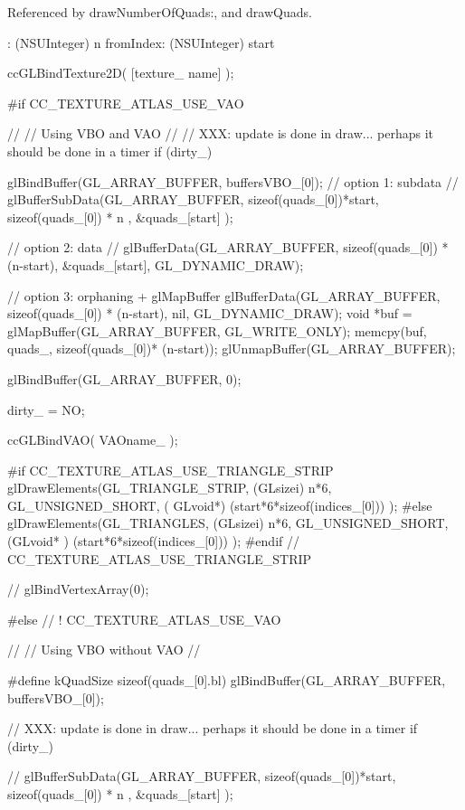 Referenced by draw\-Number\-Of\-Quads\-:, and draw\-Quads.


\begin{DoxyCode}
                         : (NSUInteger) n fromIndex: (NSUInteger) start
{
        ccGLBindTexture2D( [texture_ name] );

#if CC_TEXTURE_ATLAS_USE_VAO

        //
        // Using VBO and VAO
        //
        // XXX: update is done in draw... perhaps it should be done in a timer
        if (dirty_) {
                glBindBuffer(GL_ARRAY_BUFFER, buffersVBO_[0]);
                // option 1: subdata
//              glBufferSubData(GL_ARRAY_BUFFER, sizeof(quads_[0])*start,
       sizeof(quads_[0]) * n , &quads_[start] );
                
                // option 2: data
//              glBufferData(GL_ARRAY_BUFFER, sizeof(quads_[0]) * (n-start),
       &quads_[start], GL_DYNAMIC_DRAW);
                
                // option 3: orphaning + glMapBuffer
                glBufferData(GL_ARRAY_BUFFER, sizeof(quads_[0]) * (n-start), 
      nil, GL_DYNAMIC_DRAW);
                void *buf = glMapBuffer(GL_ARRAY_BUFFER, GL_WRITE_ONLY);
                memcpy(buf, quads_, sizeof(quads_[0])* (n-start));
                glUnmapBuffer(GL_ARRAY_BUFFER);         
                
                glBindBuffer(GL_ARRAY_BUFFER, 0);

                dirty_ = NO;
        }

        ccGLBindVAO( VAOname_ );

#if CC_TEXTURE_ATLAS_USE_TRIANGLE_STRIP
        glDrawElements(GL_TRIANGLE_STRIP, (GLsizei) n*6, GL_UNSIGNED_SHORT, (
      GLvoid*) (start*6*sizeof(indices_[0])) );
#else
        glDrawElements(GL_TRIANGLES, (GLsizei) n*6, GL_UNSIGNED_SHORT, (GLvoid*
      ) (start*6*sizeof(indices_[0])) );
#endif // CC_TEXTURE_ATLAS_USE_TRIANGLE_STRIP
        
//      glBindVertexArray(0);
        

#else // ! CC_TEXTURE_ATLAS_USE_VAO
        
        //
        // Using VBO without VAO
        //

#define kQuadSize sizeof(quads_[0].bl)
        glBindBuffer(GL_ARRAY_BUFFER, buffersVBO_[0]);
    
        // XXX: update is done in draw... perhaps it should be done in a timer
        if (dirty_) {
//              glBufferSubData(GL_ARRAY_BUFFER, sizeof(quads_[0])*start,
       sizeof(quads_[0]) * n , &quads_[start] );

}}
\end{DoxyCode}
